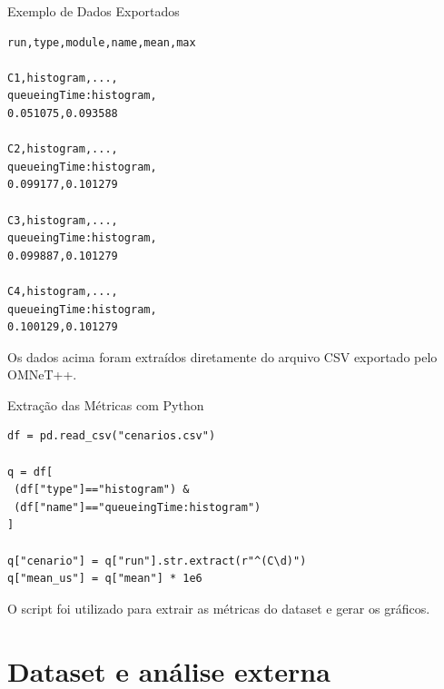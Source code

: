 \documentclass[aspectratio=169]{beamer}
\begin{document}
\begin{frame}[fragile]{Exemplo de Dados Exportados}

\scriptsize

\begin{verbatim}
run,type,module,name,mean,max

C1,histogram,...,
queueingTime:histogram,
0.051075,0.093588

C2,histogram,...,
queueingTime:histogram,
0.099177,0.101279

C3,histogram,...,
queueingTime:histogram,
0.099887,0.101279

C4,histogram,...,
queueingTime:histogram,
0.100129,0.101279
\end{verbatim}

\vspace{0.2cm}

Os dados acima foram extraídos diretamente
do arquivo CSV exportado pelo OMNeT++.

\end{frame}

\begin{frame}[fragile]{Extração das Métricas com Python}

\scriptsize

\begin{verbatim}
df = pd.read_csv("cenarios.csv")

q = df[
 (df["type"]=="histogram") &
 (df["name"]=="queueingTime:histogram")
]

q["cenario"] = q["run"].str.extract(r"^(C\d)")
q["mean_us"] = q["mean"] * 1e6
\end{verbatim}

\vspace{0.3cm}

O script foi utilizado para extrair as
métricas do dataset e gerar os gráficos.

\end{frame}


\section{Dataset e análise externa}
\end{document}
